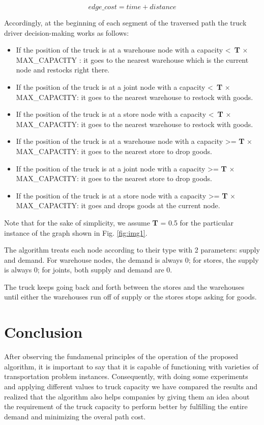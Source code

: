 \documentclass[journal,onecolumn]{IEEEtran}
\begin{document}
\begin{equation*}
edge\_cost = time + distance
\end{equation*}

Accordingly, at the beginning of each segment of the traversed path the truck driver decision-making works as follows:
\begin{itemize}
    \item{If the position of the truck is at a warehouse node with a capacity \textless  \ \textbf{T} $ \times $ MAX\_CAPACITY : it goes to the nearest warehouse which is the current node and restocks right there.}
    \item{If the position of the truck is at a joint node with a capacity \textless \ \textbf{T} $ \times $ MAX\_CAPACITY: it goes to the nearest warehouse to restock with goods.}
    \item{If the position of the truck  is at a store node with a capacity \textless  \ \textbf{T} $ \times $ MAX\_CAPACITY: it goes to the nearest warehouse to restock with goods.}
   \item{If the position of the truck is at a warehouse node with a capacity \textgreater= \textbf{T} $ \times $ MAX\_CAPACITY: it goes to the nearest store to drop goods.}
   \item{If the position of the truck is at a joint node with a capacity \textgreater= \textbf{T} $ \times $ MAX\_CAPACITY: it goes to the nearest store to drop goods.}
   \item{If the position of the truck is at a store node with a capacity \textgreater= \textbf{T} $ \times $ MAX\_CAPACITY: it goes and drops goods at the current node.}  
\end{itemize}

Note that for the sake of simplicity, we assume \textbf{T} = 0.5 for the particular instance of the graph shown in Fig. \ref{fig:img1}.

The algorithm treats each node according to their type with 2 parameters: supply and demand. For warehouse nodes, the demand is always 0; for stores, the supply is always 0; for joints, both supply and demand are 0. 

The truck keeps going back and forth between the stores and the warehouses until either the warehouses run off of supply or the stores stops asking for goods.







\section{Conclusion}
After observing the fundamenal principles of the operation of the proposed algorithm, it is important to say that it is capable of functioning with varieties of transportation problem instances. Consequently, with doing some experiments and applying different values to truck capacity we have compared the results and realized that the algorithm also helps companies by giving them an idea about the requirement of the truck capacity to perform better by fulfilling the entire demand and minimizing the overal path cost.
\end{document}
